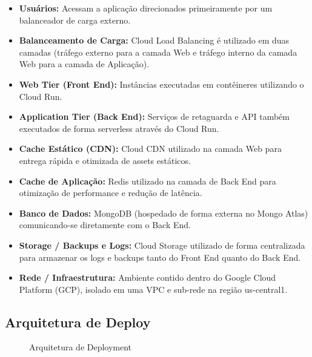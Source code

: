 \documentclass[11pt,a4paper]{article}
\begin{document}
\begin{itemize}
    \item \textbf{Usuários:} Acessam a aplicação direcionados primeiramente por um balanceador de carga externo.
    \item \textbf{Balanceamento de Carga:} Cloud Load Balancing é utilizado em duas camadas (tráfego externo para a camada Web e tráfego interno da camada Web para a camada de Aplicação).
    \item \textbf{Web Tier (Front End):} Instâncias executadas em contêineres utilizando o Cloud Run.
    \item \textbf{Application Tier (Back End):} Serviços de retaguarda e API também executados de forma serverless através do Cloud Run.
    \item \textbf{Cache Estático (CDN):} Cloud CDN utilizado na camada Web para entrega rápida e otimizada de assets estáticos.
    \item \textbf{Cache de Aplicação:} Redis utilizado na camada de Back End para otimização de performance e redução de latência.
    \item \textbf{Banco de Dados:} MongoDB (hospedado de forma externa no Mongo Atlas) comunicando-se diretamente com o Back End.
    \item \textbf{Storage / Backups e Logs:} Cloud Storage utilizado de forma centralizada para armazenar os logs e backups tanto do Front End quanto do Back End.
    \item \textbf{Rede / Infraestrutura:} Ambiente contido dentro do Google Cloud Platform (GCP), isolado em uma VPC e sub-rede na região us-central1.
\end{itemize}

\subsection{Arquitetura de Deploy}

\begin{figure}[H]
\centering
{}
\caption{Arquitetura de Deployment}
\label{fig:deployment}
\end{figure}
\end{document}
